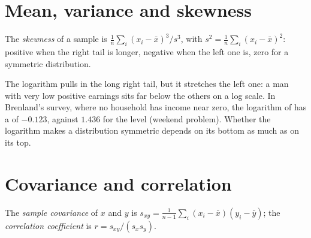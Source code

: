 \label{out:b1:describing-data:histogram}

\section{Mean, variance and skewness}\label{sec:b1:describing-data:moments}

\begin{definition}[Skewness]\label{def:b1:describing-data:skewness}
The \emph{skewness} of a sample is $\frac1n\sum_i (x_i - \bar x)^3/s^3$, with $s^2 = \frac1n\sum_i (x_i - \bar x)^2$:
positive when the right tail is longer, negative when the left one is,
zero for a symmetric distribution.
\end{definition}

\label{lst:b1:describing-data:moments}

\label{out:b1:describing-data:moments}

The logarithm pulls in the long right tail, but it stretches the left one:
a man with very low positive earnings sits far below the others on a log
scale. In Brenland's survey, where no household has income near zero, the
logarithm of  has a  of $-0.123$, against $1.436$ for
the level (weekend problem). %
Whether the logarithm makes a distribution symmetric depends on its bottom
as much as on its top.

\section{Covariance and correlation}\label{sec:b1:describing-data:correlation}

\begin{definition}\label{def:b1:describing-data:correlation}
The \emph{sample covariance} of $x$ and $y$ is $s_{xy} = \frac1{n-1}\sum_i (x_i - \bar x)(y_i - \bar y)$; the
\emph{correlation coefficient} is $r = s_{xy}/(s_x s_y)$.
\end{definition}

